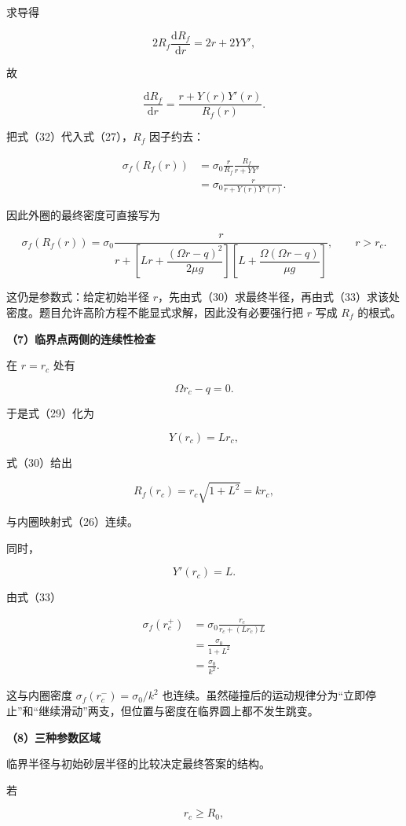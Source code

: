 \documentclass[12pt,a4paper,UTF8]{ctexart}
\begin{document}
求导得

\[
2R_f\frac{\mathrm dR_f}{\mathrm dr}
=2r+2YY',
\]

故

\[
\frac{\mathrm dR_f}{\mathrm dr}
=\frac{r+Y(r)Y'(r)}{R_f(r)}.
\tag{32}
\]

把式（32）代入式（27），\(R_f\) 因子约去：

\[
\begin{aligned}
\sigma_f(R_f(r))
&=\sigma_0\frac r{R_f}
\frac{R_f}{r+YY'}\\
&=\sigma_0\frac r{r+Y(r)Y'(r)}.
\end{aligned}
\]

因此外圈的最终密度可直接写为

\[
\boxed{
\sigma_f(R_f(r))
=\sigma_0
\frac{r}{
r+
\left[
Lr+\dfrac{(\Omega r-q)^2}{2\mu g}
\right]
\left[
L+\dfrac{\Omega(\Omega r-q)}{\mu g}
\right]
}
},
\qquad r>r_c.
\tag{33}
\]

这仍是参数式：给定初始半径
\(r\)，先由式（30）求最终半径，再由式（33）求该处密度。题目允许高阶方程不能显式求解，因此没有必要强行把
\(r\) 写成 \(R_f\) 的根式。

\textbf{（7）临界点两侧的连续性检查}

在 \(r=r_c\) 处有

\[
\Omega r_c-q=0.
\]

于是式（29）化为

\[
Y(r_c)=Lr_c,
\]

式（30）给出

\[
R_f(r_c)
=r_c\sqrt{1+L^2}
=kr_c,
\tag{34}
\]

与内圈映射式（26）连续。

同时，

\[
Y'(r_c)=L.
\]

由式（33）

\[
\begin{aligned}
\sigma_f(r_c^+)
&=\sigma_0
\frac{r_c}{r_c+(Lr_c)L}\\
&=\frac{\sigma_0}{1+L^2}\\
&=\frac{\sigma_0}{k^2}.
\end{aligned}
\tag{35}
\]

这与内圈密度 \(\sigma_f(r_c^-)=\sigma_0/k^2\)
也连续。虽然碰撞后的运动规律分为``立即停止''和``继续滑动''两支，但位置与密度在临界圆上都不发生跳变。

\textbf{（8）三种参数区域}

临界半径与初始砂层半径的比较决定最终答案的结构。

若

\[
r_c\geq R_0,
\]
\end{document}
